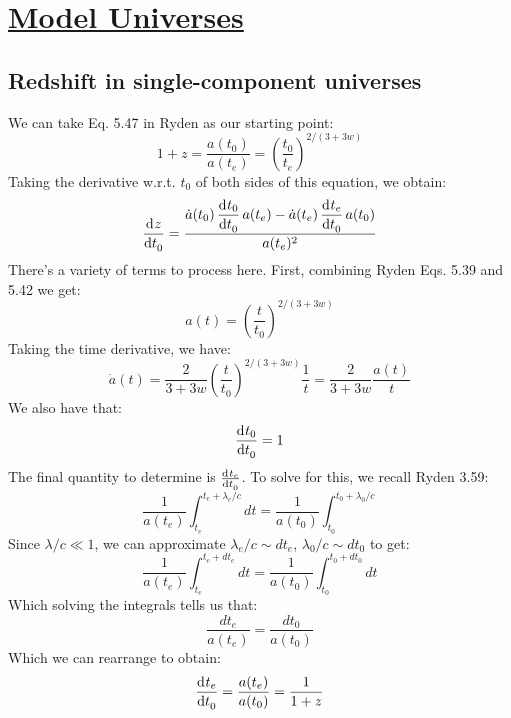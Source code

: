 \section[Model Universes]{\hyperlink{toc}{Model Universes}}
\subsection{Redshift in single-component universes}
We can take Eq. 5.47 in Ryden as our starting point:
\begin{equation}\label{start51}
    1 + z = \frac{a(t_0)}{a(t_e)} = \left(\frac{t_0}{t_e}\right)^{2/(3 + 3w)}
\end{equation}
Taking the derivative w.r.t. $t_0$ of both sides of this equation, we obtain:
\begin{equation}\label{51temp1}
    \dod{z}{t_0} = \frac{\dot{a}(t_0)\dod{t_0}{t_0}a(t_e) - \dot{a}(t_e)\dod{t_e}{t_0}a(t_0)}{a(t_e)^2}
\end{equation}
There's a variety of terms to process here. First, combining Ryden Eqs. 5.39 and 5.42 we get:
\begin{equation}
    a(t) = \left(\frac{t}{t_0}\right)^{2/(3+3w)}
\end{equation}
Taking the time derivative, we have:
\begin{equation}\label{dota51}
    \dot{a}(t) = \frac{2}{3+3w}\left(\frac{t}{t_0}\right)^{2/(3+3w)}\frac{1}{t} = \frac{2}{3+3w}\frac{a(t)}{t}
\end{equation}
We also have that:
\begin{equation}\label{t051}
    \dod{t_0}{t_0} = 1
\end{equation}
The final quantity to determine is $\od{t_e}{t_0}$. To solve for this, we recall Ryden 3.59:
\begin{equation}
    \frac{1}{a(t_e)}\int_{t_e}^{t_e + \lambda_e/c}dt = \frac{1}{a(t_0)}\int_{t_0}^{t_0 + \lambda_0/c}
\end{equation}
Since $\lambda/c \ll 1$, we can approximate $\lambda_e/c \sim dt_e$, $\lambda_0/c \sim dt_0$ to get:
\begin{equation}
    \frac{1}{a(t_e)}\int_{t_e}^{t_e + dt_e} dt = \frac{1}{a(t_0)}\int_{t_0}^{t_0 + dt_0}dt
\end{equation}
Which solving the integrals tells us that:
\begin{equation}
    \frac{dt_e}{a(t_e)} = \frac{dt_0}{a(t_0)}
\end{equation}
Which we can rearrange to obtain:
\begin{equation}\label{te51}
    \dod{t_e}{t_0} = \frac{a(t_e)}{a(t_0)} = \frac{1}{1+z}
\end{equation}
